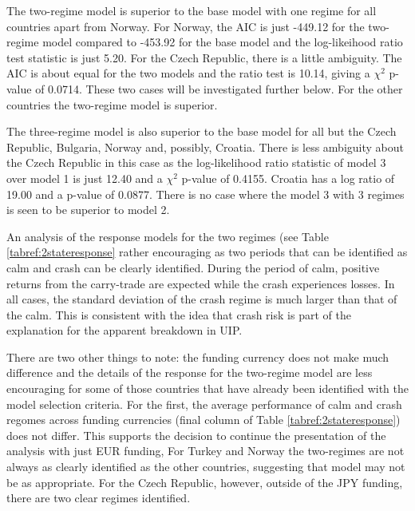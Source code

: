 \documentclass[12pt, a4paper, oneside]{article} %
\begin{document}
The two-regime model is superior to the base model with one regime for all countries apart from Norway.  For Norway, the AIC is just -449.12 for the two-regime model compared to -453.92 for the base model and the log-likeihood ratio test statistic is just 5.20.  For the Czech Republic, there is a little ambiguity.  The AIC is about equal for the two models and the ratio test is 10.14, giving a $\chi^2$ p-value of 0.0714. These two cases will be investigated further below. For the other countries the two-regime model is superior.  

The three-regime model is also superior to the base model for all but the Czech Republic, Bulgaria, Norway and, possibly, Croatia.  There is less ambiguity about the Czech Republic in this case as the log-likelihood ratio statistic of model 3 over model 1 is just 12.40 and a $\chi^2$ p-value of 0.4155.  Croatia has a log ratio of 19.00 and a p-value of 0.0877.  There is no case where the model 3 with 3 regimes is seen to be superior to model 2.  

An analysis of the response models for the two regimes (see Table \ref{tabref:2stateresponse} rather encouraging as two periods that can be identified as calm and crash can be clearly identified. During the period of calm, positive returns from the carry-trade are expected while the crash experiences losses.  In all cases, the standard deviation of the crash regime is much larger than that of the calm.  This is consistent with the idea that crash risk is part of the explanation for the apparent breakdown in UIP.  

There are two other things to note:  the funding currency does not make much difference and the details of the response for the two-regime model  are less encouraging for some of those countries that have already been identified with the model selection criteria.  For the first, the average performance of calm and crash regomes across funding currencies (final column of Table \ref{tabref:2stateresponse}) does not differ.  This supports the decision to continue the presentation of the analysis with just EUR funding, For Turkey and Norway the two-regimes are not always as clearly identified as the other countries, suggesting that model may not be as appropriate.  For the Czech Republic, however, outside of the JPY funding, there are two clear regimes identified. 
\end{document}
